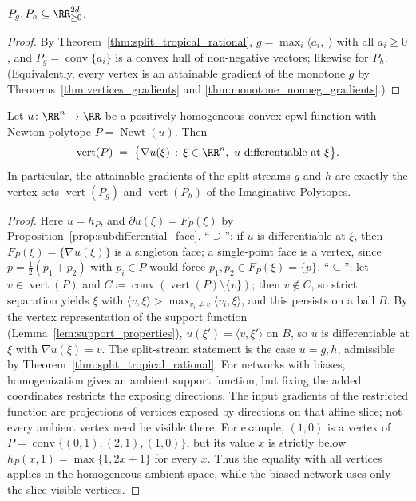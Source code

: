 \begin{corollary}\label{cor:polytopes_nonneg}
$P_g, P_h \subseteq \RR^{2d}_{\ge 0}$.
\hfill{}
\end{corollary}

\begin{proof}
By Theorem~\ref{thm:split_tropical_rational}, $g = \max_i \langle a_i, \cdot \rangle$ with all $a_i \ge 0$, and $P_g = \operatorname{conv}\{a_i\}$ is a convex hull of non-negative vectors; likewise for $P_h$. (Equivalently, every vertex is an attainable gradient of the monotone $g$ by Theorems~\ref{thm:vertices_gradients} and \ref{thm:monotone_nonneg_gradients}.)
\end{proof}

\begin{theoremenv}\label{thm:vertices_gradients}
Let $u \colon \RR^n \to \RR$ be a positively homogeneous convex \ac{cpwl} function with Newton polytope $P = \operatorname{Newt}(u)$. Then
\begin{equation*}
    \operatorname{vert}(P)
    \;=\;
    \bigl\{ \nabla u(\xi) \, : \, \xi \in \RR^n, \ u \text{ differentiable at } \xi \bigr\}.
\end{equation*}
In particular, the attainable gradients of the split streams $g$ and $h$ are exactly the vertex sets $\operatorname{vert}(P_g)$ and $\operatorname{vert}(P_h)$ of the Imaginative Polytopes.
\hfill{}
\end{theoremenv}

\begin{proof}
Here $u = h_P$, and $\partial u(\xi) = F_P(\xi)$ by Proposition~\ref{prop:subdifferential_face}. ``$\supseteq$'': if $u$ is differentiable at $\xi$, then $F_P(\xi) = \{\nabla u(\xi)\}$ is a singleton face; a single-point face is a vertex, since $p = \tfrac12(p_1 + p_2)$ with $p_i \in P$ would force $p_1, p_2 \in F_P(\xi) = \{p\}$. ``$\subseteq$'': let $v \in \operatorname{vert}(P)$ and $C \coloneqq \operatorname{conv}(\operatorname{vert}(P) \setminus \{v\})$; then $v \notin C$, so strict separation yields $\xi$ with $\langle v, \xi \rangle > \max_{v_i \ne v} \langle v_i, \xi \rangle$, and this persists on a ball $B$. By the vertex representation of the support function (Lemma~\ref{lem:support_properties}), $u(\xi') = \langle v, \xi' \rangle$ on $B$, so $u$ is differentiable at $\xi$ with $\nabla u(\xi) = v$. The split-stream statement is the case $u = g, h$, admissible by Theorem~\ref{thm:split_tropical_rational}. For networks with biases, homogenization gives an ambient support function, but fixing the added coordinates restricts the exposing directions. The input gradients of the restricted function are projections of vertices exposed by directions on that affine slice; not every ambient vertex need be visible there. For example, $(1,0)$ is a vertex of $P=\operatorname{conv}\{(0,1),(2,1),(1,0)\}$, but its value $x$ is strictly below $h_P(x,1)=\max\{1,2x+1\}$ for every $x$. Thus the equality with all vertices applies in the homogeneous ambient space, while the biased network uses only the slice-visible vertices.
\end{proof}

